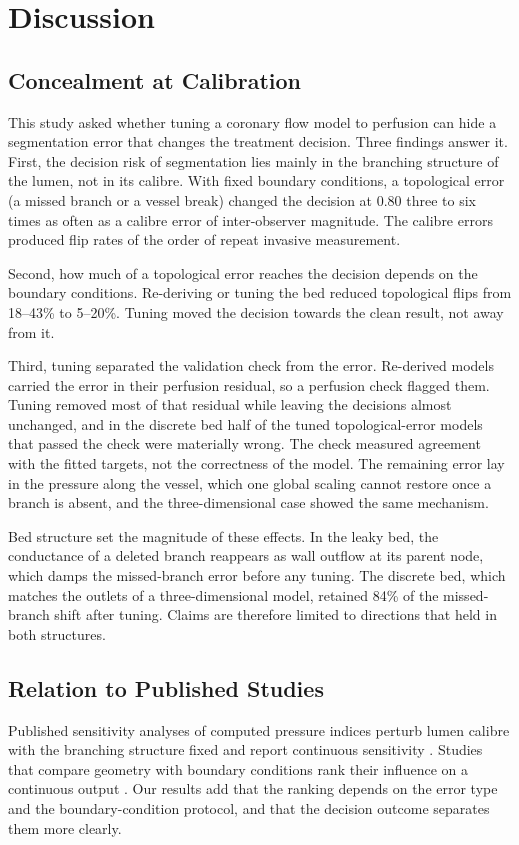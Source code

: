 \documentclass[journal]{IEEEtran}
\begin{document}
\section{Discussion}
\subsection{Concealment at Calibration}
This study asked whether tuning a coronary flow model to perfusion can hide a segmentation error that changes the
treatment decision. Three findings answer it. First, the decision risk of segmentation lies mainly in the branching structure of the lumen, not in its calibre.
With fixed boundary conditions, a topological error (a missed branch or a vessel break) changed the decision at
0.80 three to six times as often as a calibre error of inter-observer magnitude. The calibre errors produced flip
rates of the order of repeat invasive measurement.

Second, how much of a topological error reaches the decision depends on the boundary conditions. Re-deriving or
tuning the bed reduced topological flips from 18--43\% to 5--20\%. Tuning moved the decision towards the clean result, not away from it.

Third, tuning separated the validation check from the error. Re-derived models carried the error in their perfusion
residual, so a perfusion check flagged them. Tuning removed most of that residual while leaving the decisions almost
unchanged, and in the discrete bed half of the tuned topological-error models that passed the check were materially
wrong. The check measured agreement with the fitted targets, not the correctness of the model. The remaining error
lay in the pressure along the vessel, which one global scaling cannot restore once a branch is absent, and the
three-dimensional case showed the same mechanism.

Bed structure set the magnitude of these effects. In the leaky bed, the conductance of a deleted branch reappears
as wall outflow at its parent node, which damps the missed-branch error before any tuning. The discrete bed, which matches the outlets of a three-dimensional model, retained 84\% of the missed-branch shift
after tuning. Claims are therefore limited to directions that held in both structures.

\subsection{Relation to Published Studies}
Published sensitivity analyses of computed pressure indices perturb lumen calibre with the branching structure fixed and report
continuous sensitivity \cite{sankaran2015tmi,sankaran2015cmame,fernandez2024,dalmaso2025}. Studies that compare geometry with boundary conditions rank their influence on a continuous output
\cite{sankaran2016,tanade2022,korte2023}. Our results add that the ranking depends on the error type and the
boundary-condition protocol, and that the decision outcome separates them more clearly.
\end{document}
